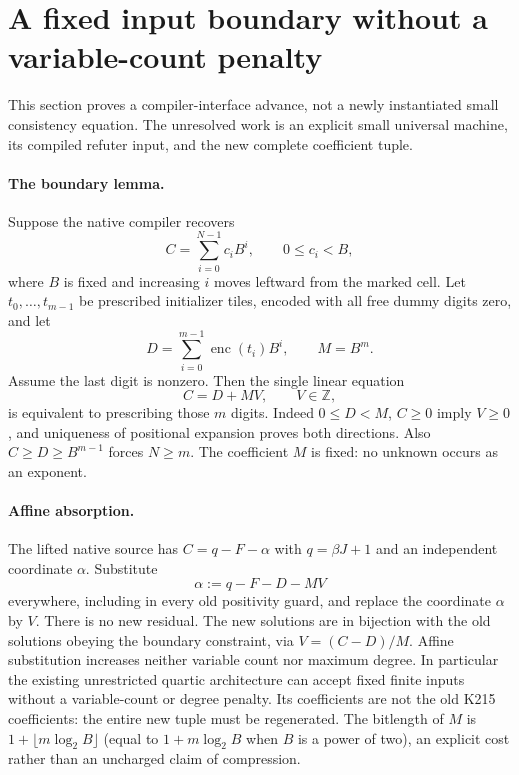 \section{A fixed input boundary without a variable-count penalty}
\label{sec:fixedinput}
This section proves a compiler-interface advance, not a newly instantiated
small consistency equation. The unresolved work is an explicit small universal
machine, its compiled refuter input, and the new complete coefficient tuple.

\paragraph{The boundary lemma.}
Suppose the native compiler recovers
\[
 C=\sum_{i=0}^{N-1}c_iB^i,\qquad 0\le c_i<B,
\]
where $B$ is fixed and increasing $i$ moves leftward from the marked cell.
Let $t_0,\ldots,t_{m-1}$ be prescribed initializer tiles, encoded with all
free dummy digits zero, and let
\[
 D=\sum_{i=0}^{m-1}\operatorname{enc}(t_i)B^i,
 \qquad M=B^m.
\]
Assume the last digit is nonzero. Then the single linear equation
\[
 C=D+MV,\qquad V\in\mathbb Z,
\]
is equivalent to prescribing those $m$ digits. Indeed $0\le D<M$,
$C\ge0$ imply $V\ge0$, and uniqueness of positional expansion proves
both directions. Also $C\ge D\ge B^{m-1}$ forces $N\ge m$.
The coefficient $M$ is fixed: no unknown occurs as an exponent.

\paragraph{Affine absorption.}
The lifted native source has $C=q-F-\alpha$ with
$q=\beta J+1$ and an independent coordinate $\alpha$. Substitute
\[
 \boxed{\alpha:=q-F-D-MV}
\]
everywhere, including in every old positivity guard, and replace the
coordinate $\alpha$ by $V$. There is no new residual. The new solutions
are in bijection with the old solutions obeying the boundary constraint,
via $V=(C-D)/M$. Affine substitution increases neither variable count nor
maximum degree. In particular the existing unrestricted quartic architecture
can accept fixed finite inputs without a variable-count or degree penalty.
Its coefficients are not the old K215 coefficients: the entire new tuple
must be regenerated. The bitlength of $M$ is $1+\lfloor m\log_2B\rfloor$ (equal to
$1+m\log_2B$ when $B$ is a power of two), an explicit
cost rather than an uncharged claim of compression.

